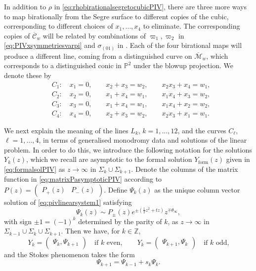 \documentclass[a4paper,reqno]{amsart}
\numberwithin{equation}{section}
\newcommand{\p}{\mathbb{P}}
\numberwithin{equation}{section}
\begin{document}
    In addition to $\rho$ in \eqref{eq:rhobirationalsegretocubicPIV}, there are three more ways to map birationally from the Segre surface to different copies of the cubic, corresponding to different choices of $x_1,\dots,x_4$ to eliminate. 
    The corresponding copies of $\overline{\mathcal{C}}_w$ will be related by combinations of $\varpi_1,\varpi_2$ in \eqref{eq:PIVxsymmetriesvarpi} and $\sigma_{(01)}$ in .
    Each of the four birational maps will produce a different line, coming from a distinguished curve on $\overline{\mathcal{M}}_w$, which corresponds to a distinguished conic in $\p^2$ under the blowup projection.
    We denote these by
    \begin{equation*} 
    \begin{aligned}
        &C_1 : \quad x_1 = 0, \qquad x_2 +x_3 = w_2, \qquad x_2 x_3+x_4=w_1, \\
        &C_2 : \quad x_2 = 0, \qquad x_1 +x_4 = w_1, \qquad x_1 x_4+x_3=w_2, \\
        &C_3 : \quad x_3 = 0, \qquad x_1 +x_4 = w_1, \qquad x_1 x_4+x_2=w_2, \\
        &C_4 : \quad x_4 = 0, \qquad x_2 +x_3 = w_2, \qquad x_2 x_3+x_1=w_1.
    \end{aligned}
    \end{equation*}


We next explain the meaning of the lines $L_k$, $k=1,\dots,12$,  and the curves $C_{\ell}$, $\ell=1,\dots,4$, 
in terms of generalised monodromy data and solutions of the linear problem.
In order to do this, we introduce the following notation for the solutions $Y_k(z)$, which we recall are asymptotic to the formal solution $Y_{\operatorname{form}}(z)$ given in \cref{eq:formalsolPIV} as $z\to\infty$ in $\Sigma_{k}\cup\Sigma_{k+1}$.
Denote the columns of the matrix function in \eqref{eq:matrixPasymptoticPIV} according to $P(z)=\begin{pmatrix}
        P_+(z) & P_-(z)
    \end{pmatrix}.$
Define $\Psi_k(z)$ as the unique column vector solution of \eqref{eq:pivlinearsystem1} satisfying
\begin{equation*}
    \Psi_k(z)\sim P_\pm(z)e^{\pm(\frac{1}{2}z^2+tz)}z^{\mp \theta_\infty},
\end{equation*}
with sign $\pm 1=(-1)^k$ determined by the parity of $k$,
as $z\rightarrow \infty$ in $\Sigma_{k-1}\cup\Sigma_k\cup\Sigma_{k+1}$. Then we have, for $k\in\mathbb{Z}$,
\begin{equation*}
    Y_k=\begin{pmatrix}
        \Psi_k,\Psi_{k+1}
    \end{pmatrix}\quad \text{if $k$ even},\qquad
     Y_k=\begin{pmatrix}
        \Psi_{k+1},\Psi_k
    \end{pmatrix}\quad \text{if $k$ odd,}
\end{equation*}
and the Stokes phenomenon takes the form
\begin{equation}\label{eq:stokesmult}
    \Psi_{k+1}=\Psi_{k-1}+s_k\Psi_k.
\end{equation}
\end{document}
